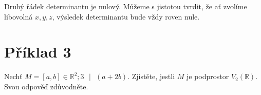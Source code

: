 \documentclass[12pt,a4paper]{article}
\newcommand{\pageline}{\noindent\makebox[\linewidth]{\rule{\linewidth}{0.4pt}}\vspace{5pt}}
\begin{document}

Druhý řádek determinantu je nulový. Můžeme s jistotou tvrdit, že ať zvolíme libovolná $x, y, z$, výsledek determinantu bude vždy roven nule.


\newpage

\section*{Příklad 3}
Nechť $M = {[a, b] \in \mathbb{R}^2; 3\text{ }|\text{ }(a + 2b)}$. Zjistěte, jestli $M$ je podprostor $V_2(\mathbb{R})$. Svou odpověď zdůvodněte.
\pageline
\end{document}
